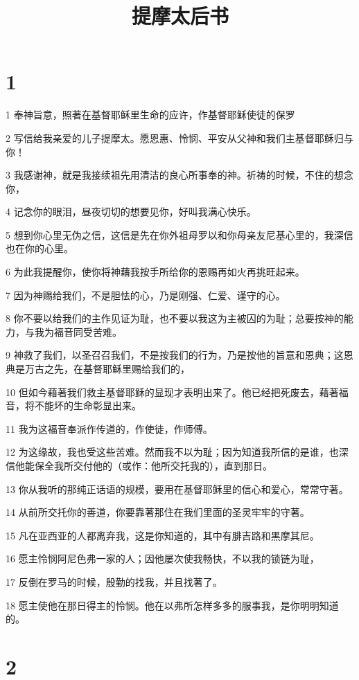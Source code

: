 

\title{提摩太后书}


\chapter{1}

\par 1 奉神旨意，照著在基督耶稣里生命的应许，作基督耶稣使徒的保罗
\par 2 写信给我亲爱的儿子提摩太。愿恩惠、怜悯、平安从父神和我们主基督耶稣归与你！
\par 3 我感谢神，就是我接续祖先用清洁的良心所事奉的神。祈祷的时候，不住的想念你，
\par 4 记念你的眼泪，昼夜切切的想要见你，好叫我满心快乐。
\par 5 想到你心里无伪之信，这信是先在你外祖母罗以和你母亲友尼基心里的，我深信也在你的心里。
\par 6 为此我提醒你，使你将神藉我按手所给你的恩赐再如火再挑旺起来。
\par 7 因为神赐给我们，不是胆怯的心，乃是刚强、仁爱、谨守的心。
\par 8 你不要以给我们的主作见证为耻，也不要以我这为主被囚的为耻；总要按神的能力，与我为福音同受苦难。
\par 9 神救了我们，以圣召召我们，不是按我们的行为，乃是按他的旨意和恩典；这恩典是万古之先，在基督耶稣里赐给我们的，
\par 10 但如今藉著我们救主基督耶稣的显现才表明出来了。他已经把死废去，藉著福音，将不能坏的生命彰显出来。
\par 11 我为这福音奉派作传道的，作使徒，作师傅。
\par 12 为这缘故，我也受这些苦难。然而我不以为耻；因为知道我所信的是谁，也深信他能保全我所交付他的（或作：他所交托我的），直到那日。
\par 13 你从我听的那纯正话语的规模，要用在基督耶稣里的信心和爱心，常常守著。
\par 14 从前所交托你的善道，你要靠著那住在我们里面的圣灵牢牢的守著。
\par 15 凡在亚西亚的人都离弃我，这是你知道的，其中有腓吉路和黑摩其尼。
\par 16 愿主怜悯阿尼色弗一家的人；因他屡次使我畅快，不以我的锁链为耻，
\par 17 反倒在罗马的时候，殷勤的找我，并且找著了。
\par 18 愿主使他在那日得主的怜悯。他在以弗所怎样多多的服事我，是你明明知道的。

\chapter{2}

